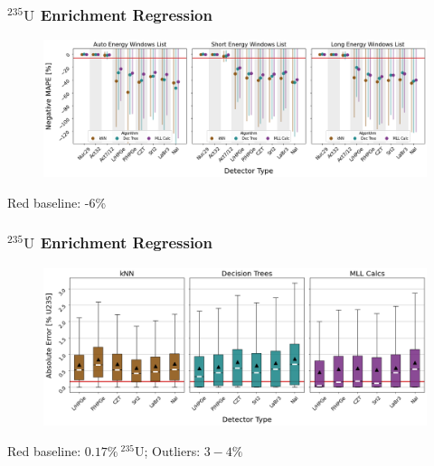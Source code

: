 \begin{frame}
  \frametitle{${}^{235}\text{U}$ Enrichment Regression}
  \begin{adjustwidth}{-15pt}{-10pt}
  \begin{figure}
    \centering
    \includegraphics[width=1.1\textwidth]{./figures/detector_preds_wrt_enlist_MAPE_enri.png}
  \end{figure}
  \vspace{12pt} \centering Red baseline: -6\% 
  \end{adjustwidth}
\end{frame}

\begin{frame}
  \frametitle{${}^{235}\text{U}$ Enrichment Regression}
  \begin{adjustwidth}{-15pt}{-10pt}
  \begin{figure}
    \centering
    \includegraphics[width=1.1\textwidth]{./figures/abserror_boxplots_auto_enri.png}
  \end{figure}
  \vspace{12pt} \centering Red baseline: $0.17\%\:{}^{235}\text{U}$; Outliers: $3-4\%$
  \end{adjustwidth}
\end{frame}


